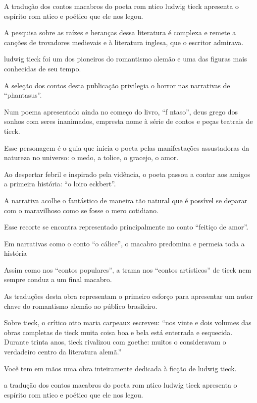 \documentclass[11pt]{extarticle}
\begin{document}
A tradução dos contos macabros do poeta rom ntico ludwig tieck apresenta o espírito rom ntico e poético que ele nos legou. 

A pesquisa sobre as raízes e heranças dessa literatura é complexa e remete a canções de trovadores medievais e à literatura inglesa, que o escritor admirava. 



ludwig tieck foi um dos pioneiros do romantismo alemão e uma das figuras mais conhecidas de seu tempo. 

A seleção dos contos desta publicação privilegia o horror nas narrativas de “phantasus”. 

Num poema apresentado ainda no começo do livro, “f ntaso”, deus grego dos sonhos com seres inanimados, empresta nome à série de contos e peças teatrais de tieck. 

Esse personagem é o guia que inicia o poeta pelas manifestações assustadoras da natureza no universo: o medo, a tolice, o gracejo, o amor. 

Ao despertar febril e inspirado pela vidência, o poeta passou a contar aos amigos a primeira história: “o loiro eckbert”. 

A narrativa acolhe o fantástico de maneira tão natural que é possível se deparar com o maravilhoso como se fosse o mero cotidiano. 

Esse recorte se encontra representado principalmente no conto “feitiço de amor”. 

Em narrativas como o conto “o cálice”, o macabro predomina e permeia toda a história

Assim como nos “contos populares”, a trama nos “contos artísticos” de tieck nem sempre conduz a um final macabro. 

As traduções desta obra representam o primeiro esforço para apresentar um autor chave do romantismo alemão ao público brasileiro.

Sobre tieck, o crítico otto maria carpeaux escreveu: “nos vinte e dois volumes das obras completas de tieck muita coisa boa e bela está enterrada e esquecida. Durante trinta anos, tieck rivalizou com goethe: muitos o consideravam o verdadeiro centro da literatura alemã.”

Você tem em mãos uma obra inteiramente dedicada à ficção de ludwig tieck.


a tradução dos contos macabros do poeta rom ntico ludwig tieck apresenta o espírito rom ntico e poético que ele nos legou. 
\end{document}
